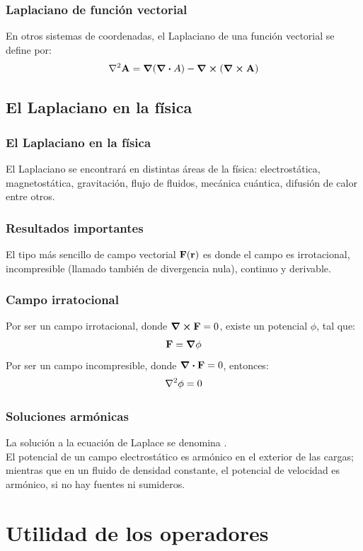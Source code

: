 \documentclass[12pt]{beamer}
\begin{document}
\begin{frame}
\frametitle{Laplaciano de función vectorial}
En otros sistemas de coordenadas, el Laplaciano de una función vectorial se define por:
\pause
\begin{align*}
\laplacian{\vb{A}} = \grad{(\div{A})} - \curl{(\curl{\vb{A}})}
\end{align*}
\end{frame}

\subsection{El Laplaciano en la física}

\begin{frame}
\frametitle{El Laplaciano en la física}
El Laplaciano se encontrará en distintas áreas de la física: electrostática, magnetostática, gravitación, flujo de fluidos, mecánica cuántica, difusión de calor entre otros.
\end{frame}
\begin{frame}
\frametitle{Resultados importantes}
El tipo más sencillo de campo vectorial $\vb{F}(\vb{r})$ es donde el campo es irrotacional, incompresible (llamado también de divergencia nula), continuo y derivable.
\end{frame}
\begin{frame}
\frametitle{Campo irratocional}
Por ser un campo irrotacional, donde $\curl{\vb{F}} = 0$, existe un potencial $\phi$, tal que:
\pause
\begin{align*}
\vb{F} = \grad{\phi}
\end{align*}
\pause
Por ser un campo incompresible, donde $\div{\vb{F}} = 0$, entonces:
\pause
\begin{align*}
\laplacian{\phi} = 0
\end{align*}
\end{frame}
\begin{frame}
\frametitle{Soluciones armónicas}
La solución a la ecuación de Laplace se denomina .
\\
\bigskip
\pause
El potencial de un campo electrostático es armónico en el exterior de las cargas; mientras que en un fluido de densidad constante, el potencial de velocidad es armónico, si no hay fuentes ni sumideros.
\end{frame}

\section{Utilidad de los operadores}
\end{document}

